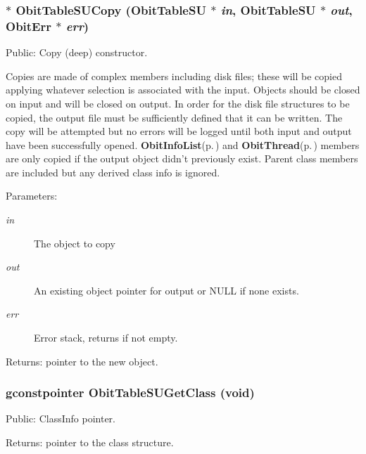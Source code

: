\subsubsection{$\ast$ Obit\-Table\-SUCopy ({\bf Obit\-Table\-SU} $\ast$ {\em in}, {\bf Obit\-Table\-SU} $\ast$ {\em out}, {\bf Obit\-Err} $\ast$ {\em err})}\label{ObitTableSU_8c_a20}


Public: Copy (deep) constructor. 

Copies are made of complex members including disk files; these will be copied applying whatever selection is associated with the input. Objects should be closed on input and will be closed on output. In order for the disk file structures to be copied, the output file must be sufficiently defined that it can be written. The copy will be attempted but no errors will be logged until both input and output have been successfully opened. {\bf Obit\-Info\-List}{\rm (p.\,\pageref{structObitInfoList})} and {\bf Obit\-Thread}{\rm (p.\,\pageref{structObitThread})} members are only copied if the output object didn't previously exist. Parent class members are included but any derived class info is ignored. \begin{Desc}
\item[Parameters:]
\begin{description}
\item[{\em in}]The object to copy \item[{\em out}]An existing object pointer for output or NULL if none exists. \item[{\em err}]Error stack, returns if not empty. \end{description}
\end{Desc}
\begin{Desc}
\item[Returns:]pointer to the new object. \end{Desc}
\subsubsection{\setlength{\rightskip}{0pt plus 5cm}gconstpointer Obit\-Table\-SUGet\-Class (void)}\label{ObitTableSU_8c_a17}


Public: Class\-Info pointer. 

\begin{Desc}
\item[Returns:]pointer to the class structure. \end{Desc}
